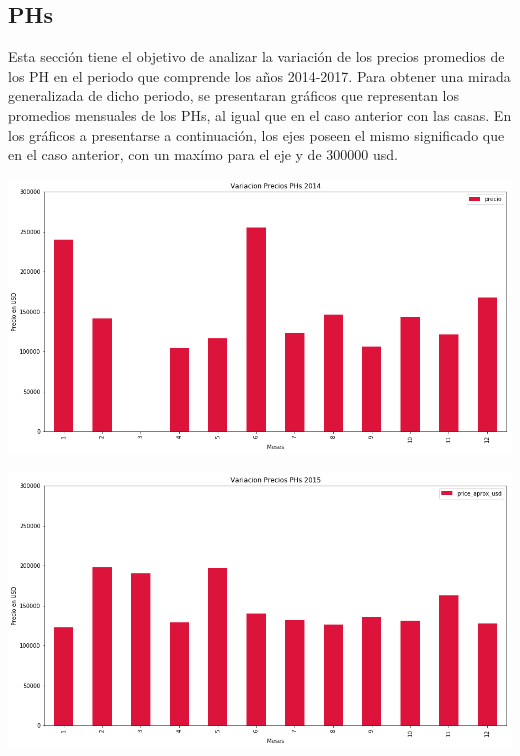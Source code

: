 \documentclass[a4paper, 10pt]{article}
\begin{document}
			\subsection{PHs}


			Esta sección tiene el objetivo de analizar la variación de los precios promedios de los PH en el periodo que comprende los años 2014-2017. Para obtener una mirada generalizada de dicho periodo, se presentaran gráficos que representan los promedios mensuales de los PHs, al igual que en el caso anterior con las casas. En los gráficos a presentarse a continuación, los ejes poseen el mismo significado que en el caso anterior, con un maxímo para el eje y de 300000 usd.

			\begin{center}
   		    		\includegraphics[width=\textwidth]{images/vPH2014}
			\end{center}

			\begin{center}
   		    		\includegraphics[width=\textwidth]{images/vPH2015}
			\end{center}
\end{document}
